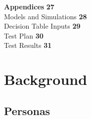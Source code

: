 \documentclass{article}
\begin{document}
\begin{titlepage}
\begin{flushleft}
    {\Large \textbf{Appendices}} \hfill \textbf{27} \\[0.5cm]
    \hspace{1cm} Models and Simulations \hfill \textbf{28} \\[0.5cm]
    \hspace{1cm} Decision Table Inputs \hfill \textbf{29} \\[0.5cm]
    \hspace{1cm} Test Plan \hfill \textbf{30} \\[0.5cm]
    \hspace{1cm} Test Results \hfill \textbf{31} \\[1cm]
    \end{flushleft}
    
\end{titlepage}

\section{Background}

\subsection{Personas}
\end{document}
